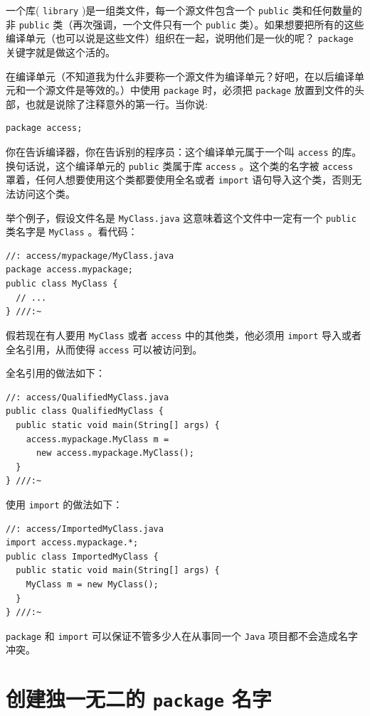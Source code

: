 \documentclass[10pt,a4paper,UTF8]{article}
\begin{document}
一个库( \texttt{library} )是一组类文件，每一个源文件包含一个 \texttt{public} 类和任何数量的非 \texttt{public} 类（再次强调，一个文件只有一个 \texttt{public} 类）。如果想要把所有的这些编译单元（也可以说是这些文件）组织在一起，说明他们是一伙的呢？ \texttt{package} 关键字就是做这个活的。

在编译单元（不知道我为什么非要称一个源文件为编译单元？好吧，在以后编译单元和一个源文件是等效的。）中使用 \texttt{package} 时，必须把 \texttt{package} 放置到文件的头部，也就是说除了注释意外的第一行。当你说:
\begin{verbatim}
package access;
\end{verbatim}
你在告诉编译器，你在告诉别的程序员：这个编译单元属于一个叫 \texttt{access} 的库。换句话说，这个编译单元的 \texttt{public} 类属于库 \texttt{access} 。这个类的名字被 \texttt{access} 罩着，任何人想要使用这个类都要使用全名或者 \texttt{import} 语句导入这个类，否则无法访问这个类。

举个例子，假设文件名是 \texttt{MyClass.java} 这意味着这个文件中一定有一个 \texttt{public} 类名字是  \texttt{MyClass} 。看代码：
\lstset{language=C,label= ,caption= ,captionpos=b,numbers=none}
\begin{lstlisting}
//: access/mypackage/MyClass.java
package access.mypackage;
public class MyClass {
  // ...
} ///:~
\end{lstlisting}
假若现在有人要用 \texttt{MyClass} 或者 \texttt{access} 中的其他类，他必须用 \texttt{import} 导入或者全名引用，从而使得 \texttt{access} 可以被访问到。


全名引用的做法如下：
\lstset{language=C,label= ,caption= ,captionpos=b,numbers=none}
\begin{lstlisting}
//: access/QualifiedMyClass.java
public class QualifiedMyClass {
  public static void main(String[] args) {
    access.mypackage.MyClass m =
      new access.mypackage.MyClass();
  }
} ///:~
\end{lstlisting}

使用 \texttt{import} 的做法如下：
\lstset{language=C,label= ,caption= ,captionpos=b,numbers=none}
\begin{lstlisting}
//: access/ImportedMyClass.java
import access.mypackage.*;
public class ImportedMyClass {
  public static void main(String[] args) {
    MyClass m = new MyClass();
  }
} ///:~
\end{lstlisting}

\texttt{package} 和 \texttt{import} 可以保证不管多少人在从事同一个 \texttt{Java} 项目都不会造成名字冲突。

\section{创建独一无二的 \texttt{package} 名字}
\label{sec:orgafe17ab}
\end{document}
